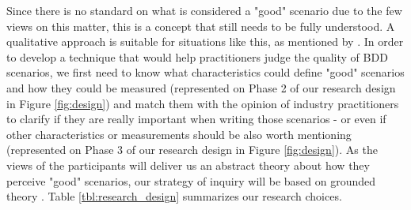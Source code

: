 Since there is no standard on what is considered a "good" scenario due to the few views on this matter, this is a concept that still needs to be fully understood. A qualitative approach is suitable for situations like this, as mentioned by \cite{Creswell_2008}. In order to develop a technique that would help practitioners judge the quality of BDD scenarios, we first need to know what characteristics could define "good" scenarios and how they could be measured (represented on Phase 2 of our research design in Figure \ref{fig:design}) and match them with the opinion of industry practitioners to clarify if they are really important when writing those scenarios - or even if other characteristics or measurements should be also worth mentioning (represented on Phase 3 of our research design in Figure \ref{fig:design}). As the views of the participants will deliver us an abstract theory about how they perceive "good" scenarios, our strategy of inquiry will be based on grounded theory \cite{Creswell_2008}. Table \ref{tbl:research_design} summarizes our research choices.